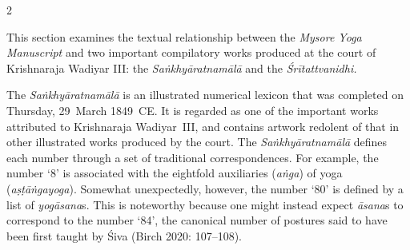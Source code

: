 \begin{nohyp}
\begin{multicols*}{2}
\begin{eng}
\label{introsec1.5}
\vskip 9pt

\noindent
This section examines the textual relationship between the \emph{Mysore Yoga Manuscript} and two important compilatory works produced at the court of Krishnaraja Wadiyar III: the \emph{Saṅkhyāratnamālā} and the \emph{Śrītattvanidhi.}

The \emph{Saṅkhyāratnamālā} is an illustrated numerical lexicon that was completed on Thursday, 29~March 1849~CE. It is regarded as one of the important works attributed to Krishnaraja Wadiyar~III, and contains artwork redolent of that in other illustrated works produced by the court. The \emph{Saṅkhyāratnamālā} defines each number through a set of traditional correspondences. For example, the number `8' is associated with the eightfold auxiliaries (\emph{aṅga}) of yoga (\emph{aṣṭāṅgayoga}). Somewhat unexpectedly, however, the number `80' is defined by a list of \emph{yogāsana}s. This is noteworthy because one might instead expect \emph{āsana}s to correspond to the number `84', the canonical number of postures said to have been first taught by Śiva (Birch 2020: 107--108).


\end{eng}
\end{multicols*}
\end{nohyp}
